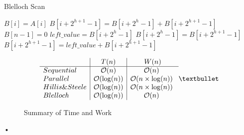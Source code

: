 \documentclass[twoside]{article}
\renewcommand{\O}[1]{$\mathcal{O}(#1)$}
\begin{document}
\begin{algorithm}
\caption{Blelloch Scan}
\begin{algorithmic}
		\State $B[i] = A[i]$
	\EndParFor
			\State $B[i + 2^{h+1} - 1] = B[i + 2^{h} - 1] + B[i + 2^{h+1} - 1] $
		\EndParFor
	\EndFor
	\State $B[n - 1] = 0$
		\State $left{\_}value = B[i + 2^{h} - 1] $
		\State $B[i + 2^{h} - 1] = B[i + 2^{h+1} - 1] $
		\State $B[i + 2^{h+1} - 1] = left{\_}value + B[i + 2^{h+1} - 1] $
	\EndFor

\EndProcedure
\end{algorithmic}
\end{algorithm}


\begin{figure}
\[
\begin{array}{l|c|c}
& T(n) & W(n)\\
\hline
Sequential & $\O{n}$ & $\O{n} $\\
Parallel & $\O{\log(n)}$ & $\O{n \times \log(n)} $\\
Hillis \& Steele & $\O{\log(n)}$ & $\O{n \times \log(n)} $\\
Blelloch & $\O{\log(n)}$ & $\O{n} $\\
\end{array}•
\]
\caption{Summary of Time and Work}
\end{figure}•
\end{document}
